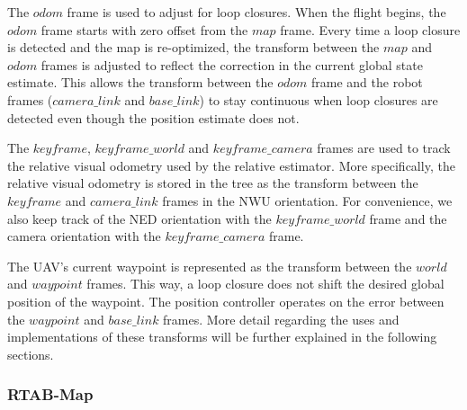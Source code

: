 \documentclass[letterpaper, 10 pt, conference]{ieeeconf}  %
\begin{document}
The $\mathit{odom}$ frame is used to adjust for loop closures. When the flight begins, the $\mathit{odom}$ frame starts with zero offset from the $\mathit{map}$ frame. Every time a loop closure is detected and the map is re-optimized, the transform between the $\mathit{map}$ and $\mathit{odom}$ frames is adjusted to reflect the correction in the current global state estimate. This allows the transform between the $\mathit{odom}$ frame and the robot frames ($\mathit{camera\_link}$ and $\mathit{base\_link}$) to stay continuous when loop closures are detected even though the position estimate does not.

The $\mathit{keyframe}$, $\mathit{keyframe\_world}$ and $\mathit{keyframe\_camera}$ frames are used to track the relative visual odometry used by the relative estimator. More specifically, the relative visual odometry is stored in the tree as the transform between the $\mathit{keyframe}$ and $\mathit{camera\_link}$ frames in the NWU orientation. For convenience, we also keep track of the NED orientation with the $\mathit{keyframe\_world}$ frame and the camera orientation with the $\mathit{keyframe\_camera}$ frame.

The UAV's current waypoint is represented as the transform between the $\mathit{world}$ and $\mathit{waypoint}$ frames. This way, a loop closure does not shift the desired global position of the waypoint. The position controller operates on the error between the $\mathit{waypoint}$ and $\mathit{base\_link}$ frames. More detail regarding the uses and implementations of these transforms will be further explained in the following sections.


\subsubsection{RTAB-Map}
\end{document}
